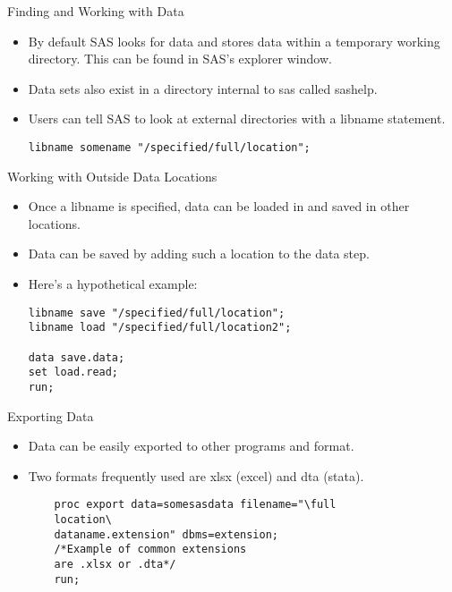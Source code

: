 \documentclass{beamer}
\begin{document}
\begin{frame}[fragile]{Finding and Working with Data}
\begin{itemize}
\item By default SAS looks for data and stores data within a temporary working directory.  This can be found in SAS's explorer window.
\item Data sets also exist in a directory internal to sas called sashelp.
\item Users can tell SAS to look at external directories with a libname statement.
\begin{verbatim}
libname somename "/specified/full/location";
\end{verbatim}
\end{itemize}
\end{frame}

\begin{frame}[fragile]{Working with Outside Data Locations}
\begin{itemize}
\item Once a libname is specified, data can be loaded in and saved in other locations.
\item Data can be saved by adding such a location to the data step.

\item Here's a hypothetical example:
\begin{verbatim}
libname save "/specified/full/location";
libname load "/specified/full/location2";

data save.data;
set load.read;
run;
\end{verbatim}
\end{itemize}
\end{frame}





\begin{frame}[fragile]{Exporting Data}
\begin{itemize}
    \item Data can be easily exported to other programs and format.
    \item Two formats frequently used are xlsx (excel) and dta (stata).
    \begin{verbatim}
    proc export data=somesasdata filename="\full 
    location\
    dataname.extension" dbms=extension;
    /*Example of common extensions 
    are .xlsx or .dta*/
    run;
        \end{verbatim}
    \end{itemize}
    \end{frame}
\end{document}
